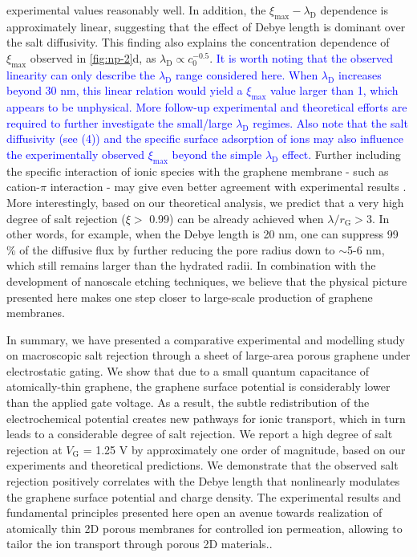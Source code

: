 experimental values reasonably well.  In addition, the
$\xi_{\mathrm{max}}-\lambda_{\mathrm{D}}$ dependence is approximately
linear, suggesting that the effect of Debye length is dominant over
the salt diffusivity.
This
finding also explains the concentration dependence of
$\xi_{\mathrm{max}}$ observed in  \autoref{fig:np-2}d, as
$\lambda_{\mathrm{D}} \propto c_{0}^{-0.5}$.
\textcolor{blue}{It is worth noting that the
  observed linearity can only describe the $\lambda_{\mathrm{D}}$
  range considered here. When $\lambda_{\mathrm{D}}$ increases beyond
  30 nm, this linear relation would yield a $\xi_{\mathrm{max}}$
  value larger than 1, which appears to be unphysical.  More follow-up
  experimental and theoretical efforts are required to further
  investigate the small/large $\lambda_{\mathrm{D}}$ regimes. Also
  note that the salt diffusivity (see  (4)) and the specific
  surface adsorption of ions may also influence the experimentally
  observed $\xi_{\mathrm{max}}$ beyond the simple
  $\lambda_{\mathrm{D}}$ effect.}
 Further including the
specific interaction of ionic species with the graphene membrane {-
  such as cation-$\pi$ interaction \cite{Shi_2013_ion_enrichment}} - may give even
better agreement with experimental results \cite{Ghosh_2018_PG_ion}. More
interestingly, based on our theoretical analysis, we predict that a
very high degree of salt rejection ($\xi>$ 0.99) can be already
achieved when $\lambda / r_{\mathrm{G}}>$3. In other words, for
example, when the Debye length is 20 nm, one can suppress 99 \% of the
diffusive flux by further reducing the pore radius down to $\sim$5-6
nm, which still remains larger than the hydrated radii. In combination
with the development of nanoscale etching techniques, we believe that
the physical picture presented here makes one step closer to
large-scale production of graphene membranes.

In summary, we have presented a comparative experimental and modelling
study on macroscopic salt rejection through a sheet of large-area
porous graphene under electrostatic gating. We show that due to a
small quantum capacitance of atomically-thin graphene, the graphene
surface potential is considerably lower than the applied gate
voltage. As a result, the subtle redistribution of the electrochemical
potential creates new pathways for ionic transport, which in turn
leads to a considerable degree of salt rejection. We report a high
degree of salt rejection at $V_{\mathrm{G}}$ = 1.25 V by approximately
one order of magnitude, based on our experiments and theoretical
predictions. We demonstrate that the observed salt
rejection positively correlates with the Debye length that nonlinearly
modulates the graphene surface potential and charge density. The
experimental results and fundamental principles presented here open an
avenue towards realization of atomically thin 2D porous membranes for
{ controlled ion permeation, allowing to tailor the ion transport through porous 2D materials.}.

